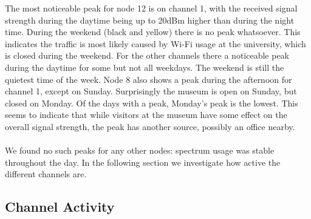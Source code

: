 \documentclass[a4paper, 11pt]{article}
\begin{document}
The most noticeable peak for node 12 is on channel 1, with the received signal strength during the daytime being up to 20dBm higher than during the night time. During the weekend (black and yellow) there is no peak whatsoever. This indicates the traffic is most likely caused by Wi-Fi usage at the university, which is closed during the weekend. For the other channels there a noticeable peak during the daytime for some but not all weekdays. The weekend is still the quietest time of the week. Node 8 also shows a peak during the afternoon for channel 1, except on Sunday. Surprisingly the museum is open on Sunday, but closed on Monday. Of the days with a peak, Monday's peak is the lowest. This seems to indicate that while visitors at the museum have some effect on the overall signal strength, the peak has another source, possibly an office nearby. \\ \\
We found no such peaks for any other nodes: spectrum usage was stable throughout the day. In the following section we investigate how active the different channels are.


\subsection{Channel Activity}
\end{document}
